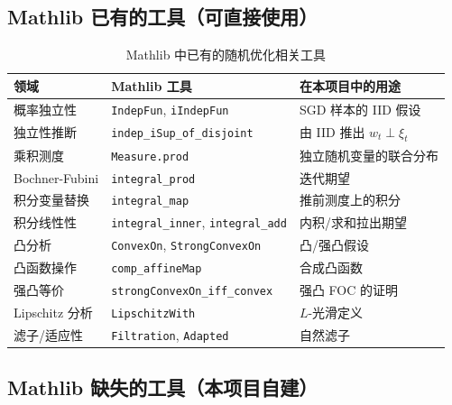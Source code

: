 \documentclass[12pt, a4paper]{article}
\newcommand{\lean}[1]{\texttt{#1}}
\begin{document}
\subsection{Mathlib 已有的工具（可直接使用）}

\begin{table}[H]
\centering
\caption{Mathlib 中已有的随机优化相关工具}
\begin{tabular}{p{3.5cm}p{4cm}p{5cm}}
\toprule
\textbf{领域} & \textbf{Mathlib 工具} & \textbf{在本项目中的用途} \\
\midrule
概率独立性 & \lean{IndepFun}, \lean{iIndepFun} & SGD 样本的 IID 假设 \\
独立性推断 & \lean{indep\_iSup\_of\_disjoint} & 由 IID 推出 $w_t \perp \xi_t$ \\
乘积测度 & \lean{Measure.prod} & 独立随机变量的联合分布 \\
Bochner-Fubini & \lean{integral\_prod} & 迭代期望 \\
积分变量替换 & \lean{integral\_map} & 推前测度上的积分 \\
积分线性性 & \lean{integral\_inner}, \lean{integral\_add} & 内积/求和拉出期望 \\
凸分析 & \lean{ConvexOn}, \lean{StrongConvexOn} & 凸/强凸假设 \\
凸函数操作 & \lean{comp\_affineMap} & 合成凸函数 \\
强凸等价 & \lean{strongConvexOn\_iff\_convex} & 强凸 FOC 的证明 \\
Lipschitz 分析 & \lean{LipschitzWith} & $L$-光滑定义 \\
滤子/适应性 & \lean{Filtration}, \lean{Adapted} & 自然滤子 \\
\bottomrule
\end{tabular}
\end{table}

\subsection{Mathlib 缺失的工具（本项目自建）}
\end{document}
